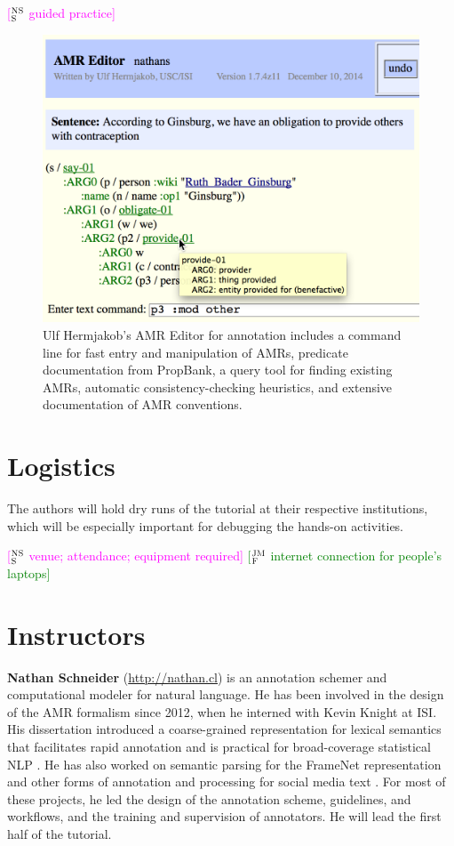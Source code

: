 \documentclass[11pt,letterpaper]{article}
\newcommand{\ensuretext}[1]{#1}
\newcommand{\jmfmarker}{\ensuretext{\textcolor{green}{\ensuremath{^{\textsc{JM}}_{\textsc{F}}}}}}
\newcommand{\nssmarker}{\ensuretext{\textcolor{magenta}{\ensuremath{^{\textsc{NS}}_{\textsc{S}}}}}}
\newcommand{\arkcomment}[3]{\ensuretext{\textcolor{#3}{[#1 #2]}}}
\newcommand{\jmf}[1]{\arkcomment{\jmfmarker}{#1}{green}}
\newcommand{\nss}[1]{\arkcomment{\nssmarker}{#1}{magenta}}
\begin{document}
\nss{guided practice}

\begin{figure}\centering
\includegraphics[width=\columnwidth]{editor_zoomed.png}
\caption{Ulf Hermjakob's AMR Editor for annotation includes a command line for fast entry and manipulation of AMRs, 
predicate documentation from PropBank, a query tool for finding existing AMRs, automatic consistency-checking heuristics, 
and extensive documentation of AMR conventions.}
\label{fig:editor}
\end{figure}

\section{Logistics}

The authors will hold dry runs of the tutorial at their respective institutions, 
which will be especially important for debugging the hands-on activities. 

\nss{venue; attendance; equipment required}
\jmf{internet connection for people's laptops}

\section{Instructors}

\textbf{Nathan Schneider} (\url{http://nathan.cl}) is an annotation schemer and computational modeler for natural language. 
He has been involved in the design of the AMR formalism since 2012, 
when he interned with Kevin Knight at ISI. 
His dissertation introduced a coarse-grained representation for lexical semantics that facilitates rapid annotation 
and is practical for broad-coverage statistical NLP \citep{schneider-thesis}. 
He has also worked on semantic parsing for the FrameNet representation \citep{das-14} 
and other forms of annotation and processing for social media text \citep{gimpel-11,owoputi-13,schneider-13,kong-14,mohit-12}.
For most of these projects, he led the design of the annotation scheme, guidelines, and workflows, 
and the training and supervision of annotators.
He will lead the first half of the tutorial.\\[-5pt]
\end{document}
